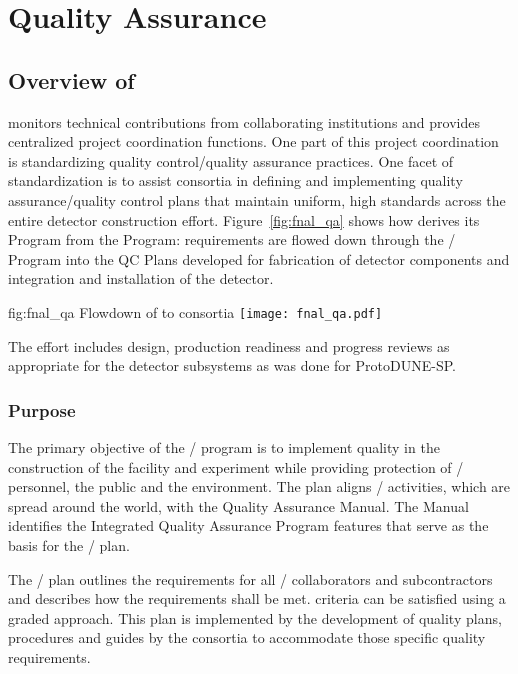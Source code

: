 \chapter{Quality Assurance}
\label{vl:tc-QA}

\section{Overview of  }

  monitors technical contributions from
collaborating institutions and provides centralized project
coordination functions. One part of this project coordination is
standardizing quality control/quality assurance practices. One facet
of standardization is to assist consortia in defining and implementing
quality assurance/quality control plans that maintain uniform, high
standards across the entire detector construction
effort. Figure~\ref{fig:fnal_qa} shows how  
derives its  Program from the \fnal {} Program:
requirements are flowed down through the /
 Program into the QC Plans developed for fabrication of
detector components and integration and installation of the detector.
\begin{dunefigure}{fig:fnal_qa}
  {Flowdown of \fnal {} to consortia}
  \texttt{[image: fnal\_qa.pdf]}
\end{dunefigure}
The  effort includes design, production readiness and
progress reviews as appropriate for the  detector
subsystems as was done for ProtoDUNE-SP.

\subsection{Purpose}

The primary objective of the / 
program is to implement quality in the construction of the
 facility and  experiment while providing
protection of / personnel, the public and the
environment. The  plan aligns /
 activities, which are spread around the world, with the
\fnal Quality Assurance Manual. The Manual identifies the \fnal
Integrated Quality Assurance Program features that serve as the basis
for the /  plan.

The /  plan outlines the 
requirements for all / collaborators and
subcontractors and describes how the requirements shall be met.
 criteria can be satisfied using a graded approach. This
 plan is implemented by the development of quality plans,
procedures and guides by the consortia to accommodate those specific
quality requirements.

